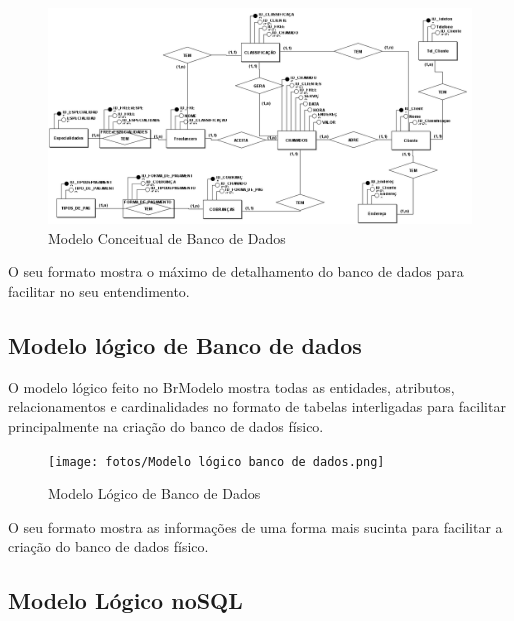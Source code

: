 \documentclass[
  a4paper,%
  12pt,%
  english,%
  brazilian,%
]{article}
\begin{document}
\begin{figure}[h]
\centering
\caption{Modelo Conceitual de Banco de Dados}%
\label{fig:diagrama-objetos}
 \includegraphics[width=1\textwidth]{fotos/modelo conceitual banco de dados.png}
\end{figure}

    O seu formato mostra o máximo de detalhamento do banco de dados para facilitar no seu entendimento.

\break

\subsection*{Modelo lógico de Banco de dados}

    O modelo lógico feito no BrModelo mostra todas as entidades, atributos, relacionamentos e cardinalidades no formato de tabelas interligadas para facilitar principalmente na criação do banco de dados físico.

\begin{figure}[h]
\centering
\caption{Modelo Lógico de Banco de Dados}%
\label{fig:diagrama-objetos}
 \texttt{[image: fotos/Modelo lógico banco de dados.png]}
\end{figure}

    O seu formato mostra as informações de uma forma mais sucinta para facilitar a criação do banco de dados físico.

\break

\subsection*{Modelo Lógico noSQL}
\end{document}
